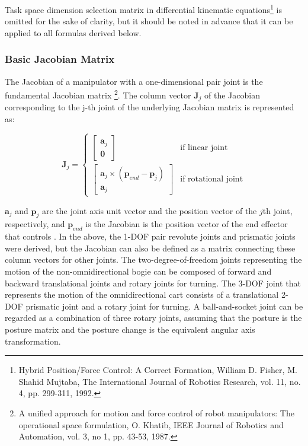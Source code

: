 Task space dimension selection matrix in differential kinematic equations\footnote{Hybrid Position/Force Control: A Correct Formation,
William D. Fisher, M. Shahid Mujtaba,
The International Journal of Robotics Research, vol. 11, no. 4, pp. 299-311, 1992.}
is omitted for the sake of clarity, but it should be noted in advance that it can be applied to all formulas derived below.

\subsubsection{Basic Jacobian Matrix}
The Jacobian of a manipulator with a one-dimensional pair joint is the fundamental Jacobian matrix \footnote{A unified approach for motion and force control of robot manipulators: The operational space formulation, O. Khatib, IEEE Journal of Robotics and Automation, vol. 3, no 1, pp. 43-53, 1987.}.
The column vector $\bm{J}_j$ of the Jacobian corresponding to the j-th joint of the underlying Jacobian matrix is represented as:

\begin{equation}
\label{eq:basic-jacobian-column-vector}
\bm{J}_j=
\begin{cases}
\left[
\begin{array}{ccc}
\bm{a}_j\\
\bm{0}
\end{array}
\right]
& \text{if linear joint} \\
\left[
\begin{array}{ccc}
\bm{a}_j \times (\bm{p}_{end} - \bm{p}_j)\\
\bm{a}_j
\end{array}
\right]
& \text{if rotational joint}
\end{cases}
\end{equation}

$\bm{a}_j$ and $\bm{p}_j$ are the joint axis unit vector and the position vector of the $j$th joint, respectively, and $\bm{p}_{end}$ is the Jacobian is the position vector of the end effector that controls .
In the above, the 1-DOF pair revolute joints and prismatic joints were derived, but the Jacobian can also be defined as a matrix connecting these column vectors for other joints.
The two-degree-of-freedom joints representing the motion of the non-omnidirectional bogie can be composed of forward and backward translational joints and rotary joints for turning.
The 3-DOF joint that represents the motion of the omnidirectional cart consists of a translational 2-DOF prismatic joint and a rotary joint for turning.
A ball-and-socket joint can be regarded as a combination of three rotary joints, assuming that the posture is the posture matrix and the posture change is the equivalent angular axis transformation.


